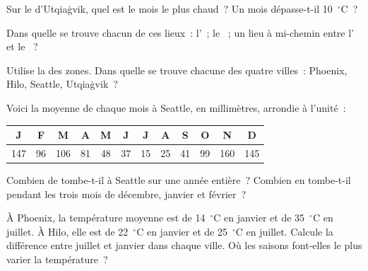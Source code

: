 \begin{exercise}[$\star$]\label{exo:g5:weather-and-climate:4}
Sur le  d'Utqiaġvik, quel est le mois le plus chaud~?
Un mois dépasse-t-il 10~$^\circ$C~?
\end{exercise}

\begin{exercise}[$\star$]\label{exo:g5:weather-and-climate:5}
Dans quelle  se trouve chacun de ces lieux~: l'~; le
~; un lieu à mi-chemin entre l' et le ~?
\end{exercise}

\begin{exercise}[$\star$]\label{exo:g5:weather-and-climate:6}
Utilise la  des zones. Dans quelle  se trouve chacune
des quatre villes~: Phoenix, Hilo, Seattle, Utqiaġvik~?
\end{exercise}

\begin{exercise}[$\star\star$]\label{exo:g5:weather-and-climate:7}
Voici la  moyenne de chaque mois à Seattle, en millimètres, arrondie à
l'unité~:
\begin{center}
\begin{tabular}{|*{12}{c|}}
\hline
J & F & M & A & M & J & J & A & S & O & N & D\\
\hline
147 & 96 & 106 & 81 & 48 & 37 & 15 & 25 & 41 & 99 & 160 & 145\\
\hline
\end{tabular}
\end{center}
Combien de  tombe-t-il à Seattle sur une année entière~? Combien en
tombe-t-il pendant les trois mois de décembre, janvier et février~?
\end{exercise}

\begin{exercise}[$\star\star$]\label{exo:g5:weather-and-climate:8}
À Phoenix, la température moyenne est de 14~$^\circ$C en janvier et de
35~$^\circ$C en juillet. À Hilo, elle est de 22~$^\circ$C en janvier et de
25~$^\circ$C en juillet. Calcule la différence entre juillet et janvier
dans chaque ville. Où les saisons font-elles le plus varier la
température~?
\end{exercise}

